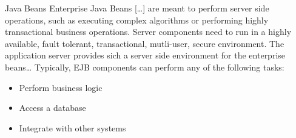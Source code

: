 \begin{defi}{Java Beans}
    Enterprise Java Beans [\ldots] are meant to perform server side operations, such as executing complex algorithms or performing highly transactional business operations.
    Server components need to run in a highly available, fault tolerant, transactional, mutli-user, secure environment.
    The application server provides sich a server side environment for the enterprise beans\ldots
    Typically, EJB components can perform any of the following tasks:
    \begin{itemize}
        \item Perform business logic
        \item Access a database
        \item Integrate with other systems
    \end{itemize}
\end{defi}